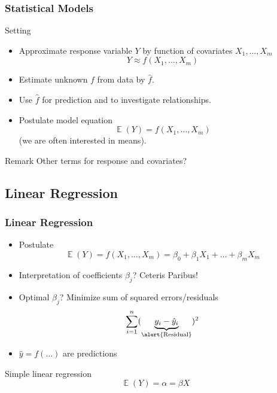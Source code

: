 \documentclass[
    utf8,
    aspectratio=169
]{beamer}  %
\DeclareMathOperator{\E}{\mathbb{E}}  %
\begin{document}
\begin{frame}
\frametitle{Statistical Models}
\begin{block}{Setting}
	\begin{itemize}
		\item Approximate \alert{response variable} $Y$ by function of \alert{covariates} $X_1,\dots,X_m$
		$$
			Y \approx f(X_1,\dots,X_m)
		$$
		\item Estimate unknown $f$ from data by $\hat f$.
		\item Use $\hat f$ for prediction and to investigate relationships.
		\item Postulate model equation
		$$
			\E(Y) = f(X_1, \dots, X_m)
		$$
		(we are often interested in means).
		\end{itemize}
	\end{block}
	
	\begin{block}{Remark}
	Other terms for response and covariates?
	\end{block}
\end{frame}

\subsection{Linear Regression}

\begin{frame}
\frametitle{Linear Regression}
\begin{itemize}
	\item Postulate 
	$$
		\E(Y) = f(X_1, \dots, X_m)=\beta_0 + \beta_1 X_1 + \dots + \beta_m X_m
	$$
	\item Interpretation of coefficients $\beta_j$? Ceteris Paribus!
	\item Optimal $\hat \beta_j$? Minimize sum of squared errors/residuals
	$$
		\sum_{i = 1}^n (\underbrace{y_i - \hat y_i}_{\text{\alert{Residual}}})^2 
	$$
	\item $\hat y = f(\dots)$ are \alert{predictions}
\end{itemize}

\begin{example}
	Simple linear regression 
	$$
		\E(Y)=\alpha = \beta X
	$$
\end{example}
\end{frame}
\end{document}
